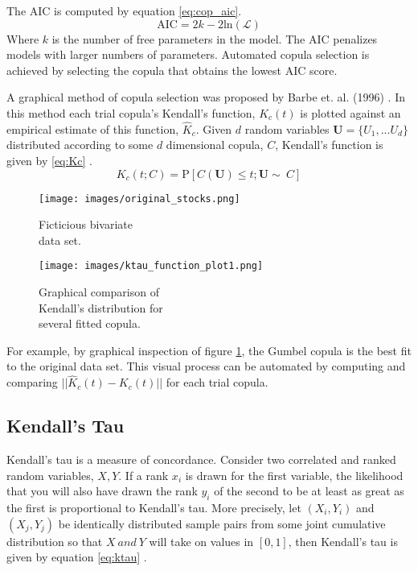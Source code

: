 The AIC is computed by equation \ref{eq:cop_aic}.
\begin{equation}
\mathrm{AIC} = 2k - 2\mathrm{ln}(\mathcal{L})
\label{eq:cop_aic}
\end{equation}
Where $k$ is the number of free parameters in the model.  The AIC penalizes models with larger numbers of parameters. 
Automated copula selection is achieved by selecting the copula that obtains the lowest AIC score.

A graphical method of copula selection was proposed by Barbe et. al. (1996) \cite{Barbe1996}.  In this method each trial copula's Kendall's function, $K_c(t)$ is plotted against an empirical estimate of this function, $\hat K_c$.  Given $d$ random variables $\mathbf U=\{U_1, ... U_d\}$ distributed according to some $d$ dimensional copula, $C$, Kendall's function is given by \ref{eq:Kc} \cite{Joe2015}.
\begin{equation}
K_c(t; C) = \mathrm P \left[C(\mathbf U) \leq t; \mathbf{U} \sim\ C\right]
\label{eq:Kc}
\end{equation}

\begin{figure}[!htbp]
	\centering
	\begin{minipage}{.45\textwidth}
		\texttt{[image: images/original\_stocks.png]}
		\caption{Ficticious bivariate \\ data set.}
		\label{fig:biv_data_ex}
	\end{minipage}%
	\begin{minipage}{.45\textwidth}
		\texttt{[image: images/ktau\_function\_plot1.png]}
		\caption{Graphical comparison of  \\ Kendall's distribution for \\ several fitted copula.}
		\label{fig:kc_fn_compare}
	\end{minipage}
\end{figure}
For example, by graphical inspection of figure \ref{fig:kc_fn_compare}, the Gumbel copula is the best fit to the original data set.  This visual process can be automated by computing and comparing $||\hat K_c(t) - K_c(t)||$ for each trial copula.

\subsection*{Kendall's Tau}

Kendall's tau is a measure of concordance.  Consider two correlated and ranked random variables, $X, Y$.
If a rank $x_i$ is drawn for the first variable, the likelihood that you will also have drawn the rank $y_i$ of the second to be at least as great as the first is proportional to Kendall's tau.  More precisely, let $(X_i, Y_i)$ and $(X_j, Y_j)$ be identically distributed sample pairs from some joint cumulative distribution so that $X\ and\ Y$ will take on values in $[0,1]$, then Kendall's tau is given by equation \ref{eq:ktau} \cite{Nelsen2006}.  

